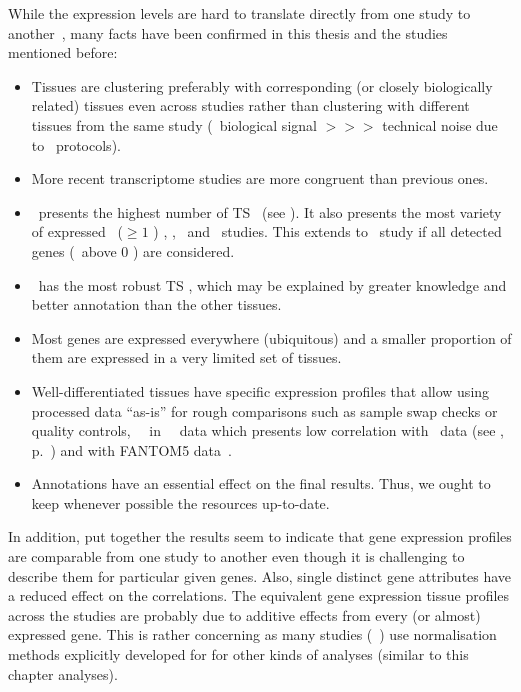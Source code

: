 While the expression levels are hard to translate directly from one study
to another~,
many facts have been confirmed in this thesis and the studies mentioned before:\begin{itemize}[nosep,topsep=0pt]
        \item Tissues are clustering preferably with corresponding
            (or closely biologically related) tissues even across studies
            rather than clustering with different tissues from the same study
            (\ie\ biological signal $>>>$ technical noise due to \Rnaseq\ protocols).
        \item More recent transcriptome studies are more congruent than previous ones.
        \item \testis\ presents the highest number of \gls{TS} \pcgs\
            (see ).
            It also presents the most variety of expressed \pcgs\ ($≥1$ \FPKM)
            \castle, \brawand, \ibm\ and \uhlen\ studies.
            This extends to \gtex\ study if all detected genes (\ie\ above 0 \FPKM)
            are considered.
        \item \liver\ has the most robust \gls{TS} \pcgs,
            which may be explained by greater knowledge
            and better annotation than the other tissues.
        \item Most genes are expressed everywhere (ubiquitous) and
          a smaller proportion of them are expressed in a very limited set of tissues.
        \item Well-differentiated tissues have specific expression profiles
            that allow using processed data \enquote{as-is} for rough comparisons
            such as sample swap checks
            or quality controls, \eg\ \salivary\ in \uhlen\ \etal\ data which
            presents low correlation with
            \gtex\ data (see ,
            p.~\pageref{fig:SamedistribPearsCorr}) and with
            FANTOM5 data~.
        \item Annotations have an essential effect on the final results.
              Thus, we ought to keep whenever possible the resources up-to-date.
\end{itemize}

In addition,
put together the results seem to indicate that
gene expression profiles are comparable from one study to another even though
it is challenging to describe them for particular given genes.
Also, single distinct gene attributes have a reduced effect on the correlations.
The equivalent gene expression tissue profiles across the studies
are probably due to additive effects from every (or almost) expressed gene.
This is rather concerning as many studies (\eg{}~\cite{Sudmant2015-zt})
use normalisation methods explicitly developed for \glsxtrfull{DGEA}
for other kinds of analyses (similar to this chapter analyses).


